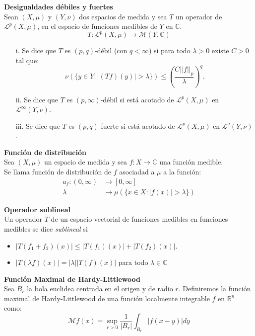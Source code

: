 \documentclass[a0,portrait]{a0poster}
\begin{document}
\begin{multicols}{2}
{{{\begin{minipage}{.93\columnwidth}
						 \textbf{Desigualdades débiles y fuertes}\\
							Sean $(X,\mu)$ y $(Y, \nu)$ dos espacios de medida y sea $T$ un operador de $\mathcal{L}^{p}(X,\mu)$, en el espacio de funciones medibles de $Y$ en $\mathbb{C}$.
							$$T:\mathcal{L}^p(X,\mu)\rightarrow\mathcal{M}(Y,\mathbb{C})$$
							\begin{itemize}
								\item[i.] Se dice que $T$ es $(p,q)$-débil (con $q<\infty$) si para todo $\lambda>0$ existe $C>0$ tal que:
								$$\nu(\{y\in Y:|(Tf)(y)|>\lambda\})\leq \left(\frac{C||f||_p}{\lambda}\right)^q.$$
								\item[ii.] Se dice que $T$ es $(p,\infty)$-débil si está acotado de $\mathcal{L}^p(X,\mu)$ en $\mathcal{L}^{\infty}(Y,\nu)$.
								\item[iii.] Se dice que $T$ es $(p,q)$-fuerte si está acotado de $\mathcal{L}^p(X,\mu)$ en $\mathcal{L}^q(Y,\nu)$.
							\end{itemize}

       \vspace{0.3cm}
							
							\textbf{Función de distribución}\\
							Sea $(X,\mu)$ un espacio de medida y sea $f:X\rightarrow \mathbb{C}$ una función medible.\\
							Se llama función de distribución de $f$ asociadad a $\mu$ a la función:\\
							\begin{align*}
								a_f:(0,\infty)&\rightarrow [0,\infty]\\
								\lambda&\rightarrow \mu(\{x\in X: |f(x)|>\lambda\})	
							\end{align*}
							
							\textbf{Operador sublineal}\\
							Un operador $T$ de un espacio vectorial de funciones medibles en funciones medibles se dice \emph{sublineal} si
							\begin{itemize}
								\item $|T(f_1+f_2)(x)|\leq |T(f_1)(x)|+|T(f_2)(x)|$.\\
								\item $|T(\lambda f)(x)| = |\lambda||T(f)(x)|$ para todo $\lambda\in\mathbb{C}$
							\end{itemize}
       
							\vspace{1cm}
							\textbf{Función Maximal de Hardy-Littlewood}\\
							Sea $B_r$ la bola euclidea centrada en el origen y de radio $r$. Definiremos la función maximal de Hardy-Littlewood de una función localmente integrable $f$ en $\mathbb{R}^n$ como:
							$$\mathcal{M}f(x)=\sup_{r>0}\frac{1}{|B_r|}\int_{B_r}|f(x-y)|dy$$
						

\end{minipage}}}}
\end{multicols}
\end{document}
